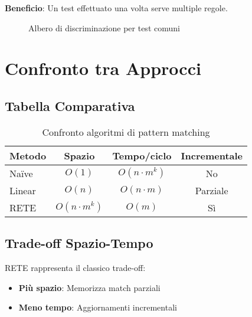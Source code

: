 \textbf{Beneficio}: Un test effettuato una volta serve multiple regole.

\begin{figure}[h]
\centering
{}
\caption{Albero di discriminazione per test comuni}
\label{fig:discriminazione}
\end{figure}

\section{Confronto tra Approcci}

\subsection{Tabella Comparativa}

\begin{table}[h]
\centering
\begin{tabular}{@{}lccc@{}}
\toprule
\textbf{Metodo} & \textbf{Spazio} & \textbf{Tempo/ciclo} & \textbf{Incrementale} \\
\midrule
Naïve & $O(1)$ & $O(n \cdot m^k)$ & No \\
Linear & $O(n)$ & $O(n \cdot m)$ & Parziale \\
RETE & $O(n \cdot m^k)$ & $O(m)$ & Sì \\
\bottomrule
\end{tabular}
\caption{Confronto algoritmi di pattern matching}
\label{tab:confronto_matching}
\end{table}

\subsection{Trade-off Spazio-Tempo}

RETE rappresenta il classico trade-off:
\begin{itemize}
\item \textbf{Più spazio}: Memorizza match parziali
\item \textbf{Meno tempo}: Aggiornamenti incrementali
\end{itemize}

